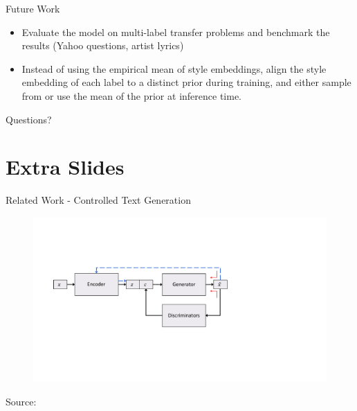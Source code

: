\documentclass[aspectratio=169]{beamer}
\newcommand{\imgsrc}[1]{\tiny{Source: #1}}
\begin{document}
% 

\begin{frame}{Future Work}
	\begin{itemize}
		\item Evaluate the model on multi-label transfer problems and benchmark the results (Yahoo questions, artist lyrics)
		\item Instead of using the empirical mean of style embeddings, align the style embedding of each label to a distinct prior during training, and either sample from or use the mean of the prior at inference time.
	\end{itemize}
\end{frame}

% 

\begin{frame}[allowframebreaks]
	
	
\end{frame}

% 

\begin{frame}
	\centering
	\Huge{Questions?}
\end{frame}

% 

\section{Extra Slides}

\begin{frame}{Related Work - Controlled Text Generation}
	\centering
	\begin{figure}[ht]
		\includegraphics[width=\textwidth]{images/tcg-architecture}
	\end{figure}
	\imgsrc{\citet{hu2017toward}}
\end{frame}

% 
\end{document}
